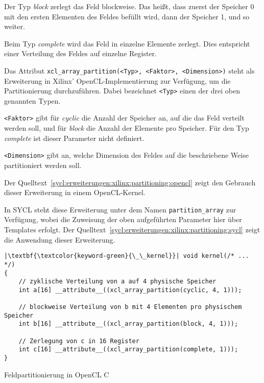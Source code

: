 Der Typ \textit{block} zerlegt das Feld blockweise. Das heißt, dass zuerst der
Speicher 0 mit den ersten Elementen des Feldes befüllt wird, dann der Speicher
1, und so weiter. \cite[vgl.][17]{sdxpragma2019}

Beim Typ \textit{complete} wird das Feld in einzelne Elemente zerlegt. Dies
entspricht einer Verteilung des Feldes auf einzelne Register.
\cite[vgl.][17]{sdxpragma2019}

Das Attribut \texttt{xcl\_array\_partition(<Typ>, <Faktor>, <Dimension>)} steht
als Erweiterung in Xilinx' OpenCL-Implementierung zur Verfügung, um die
Partitionierung durchzuführen. Dabei bezeichnet \texttt{<Typ>} einen der drei
oben genannten Typen. \cite[vgl.][17]{sdxpragma2019}

\texttt{<Faktor>} gibt für \textit{cyclic} die Anzahl der Speicher an, auf die
das Feld verteilt werden soll, und für \textit{block} die Anzahl der Elemente
pro Speicher. Für den Typ \textit{complete} ist dieser Parameter nicht
definiert. \cite[vgl.][17]{sdxpragma2019}

\texttt{<Dimension>} gibt an, welche Dimension des Feldes auf die beschriebene
Weise partitioniert werden soll. \cite[vgl.][17]{sdxpragma2019}

Der Quelltext~\ref{sycl:erweiterungen:xilinx:partitioning:opencl} zeigt den
Gebrauch dieser Erweiterung in einem OpenCL-Kernel.

In SYCL steht diese Erweiterung unter dem Namen \texttt{partition\_array} zur
Verfügung, wobei die Zuweisung der oben aufgeführten Parameter hier über
Templates erfolgt. Der
Quelltext~\ref{sycl:erweiterungen:xilinx:partitioning:sycl} zeigt die Anwendung
dieser Erweiterung.

\begin{code}
    \begin{verbatim}
|\textbf{\textcolor{keyword-green}{\_\_kernel}}| void kernel(/* ... */)
{
    // zyklische Verteilung von a auf 4 physische Speicher
    int a[16] __attribute__((xcl_array_partition(cyclic, 4, 1)));

    // blockweise Verteilung von b mit 4 Elementen pro physischem Speicher
    int b[16] __attribute__((xcl_array_partition(block, 4, 1)));

    // Zerlegung von c in 16 Register
    int c[16] __attribute__((xcl_array_partition(complete, 1)));
}
    \end{verbatim}
    \caption{Feldpartitionierung in OpenCL C}
    \label{sycl:erweiterungen:xilinx:partitioning:opencl}
\end{code}

